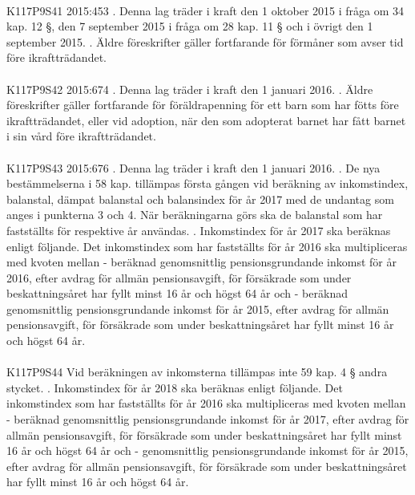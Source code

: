 \documentclass[a4paper,notitlepage,openany,10pt]{book}
\begin{document}
\paragraph*{}
{\tiny K117P9S41}
2015:453
. Denna lag träder i kraft den 1 oktober 2015 i fråga om 34 kap. 12 §, den 7 september 2015 i fråga om 28 kap. 11 § och i övrigt den 1 september 2015.
. Äldre föreskrifter gäller fortfarande för förmåner som avser tid före ikraftträdandet.
\paragraph*{}
{\tiny K117P9S42}
2015:674
. Denna lag träder i kraft den 1 januari 2016.
. Äldre föreskrifter gäller fortfarande för föräldrapenning för ett barn som har fötts före ikraftträdandet, eller vid adoption, när den som adopterat barnet har fått barnet i sin vård före ikraftträdandet.
\paragraph*{}
{\tiny K117P9S43}
2015:676
. Denna lag träder i kraft den 1 januari 2016.
. De nya bestämmelserna i 58 kap. tillämpas första gången vid beräkning av inkomstindex, balanstal, dämpat balanstal och balansindex för år 2017 med de undantag som anges i punkterna 3 och 4. När beräkningarna görs ska de balanstal som har fastställts för respektive år användas.
. Inkomstindex för år 2017 ska beräknas enligt följande. Det inkomstindex som har fastställts för år 2016 ska multipliceras med kvoten mellan
\newline - beräknad genomsnittlig pensionsgrundande inkomst för år 2016, efter avdrag för allmän pensionsavgift, för försäkrade som under beskattningsåret har fyllt minst 16 år och högst 64 år och
\newline - beräknad genomsnittlig pensionsgrundande inkomst för år 2015, efter avdrag för allmän pensionsavgift, för försäkrade som under beskattningsåret har fyllt minst 16 år och högst 64 år.
\paragraph*{}
{\tiny K117P9S44}
Vid beräkningen av inkomsterna tillämpas inte 59 kap. 4 § andra stycket.
. Inkomstindex för år 2018 ska beräknas enligt följande. Det inkomstindex som har fastställts för år 2016 ska multipliceras med kvoten mellan
\newline - beräknad genomsnittlig pensionsgrundande inkomst för år 2017, efter avdrag för allmän pensionsavgift, för försäkrade som under beskattningsåret har fyllt minst 16 år och högst 64 år och
\newline - genomsnittlig pensionsgrundande inkomst för år 2015, efter avdrag för allmän pensionsavgift, för försäkrade som under beskattningsåret har fyllt minst 16 år och högst 64 år.
\end{document}
